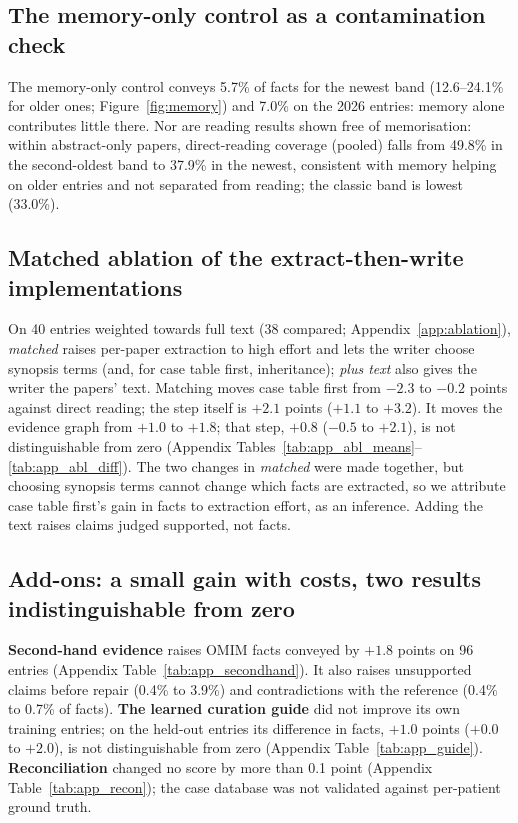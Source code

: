 \documentclass{article} %
\begin{document}
\subsection{The memory-only control as a contamination check}
\label{sec:memory}
The memory-only control conveys 5.7\% of facts for the newest band (12.6--24.1\% for older ones; Figure~\ref{fig:memory}) and 7.0\% on the 2026 entries: memory alone contributes little there. Nor are reading results shown free of memorisation: within abstract-only papers, direct-reading coverage (pooled) falls from 49.8\% in the second-oldest band to 37.9\% in the newest, consistent with memory helping on older entries and not separated from reading; the classic band is lowest (33.0\%).

\subsection{Matched ablation of the extract-then-write implementations}
\label{sec:ablation}
On 40 entries weighted towards full text (38 compared; Appendix~\ref{app:ablation}), \emph{matched} raises per-paper extraction to high effort and lets the writer choose synopsis terms (and, for case table first, inheritance); \emph{plus text} also gives the writer the papers' text. Matching moves case table first from $-2.3$ to $-0.2$ points against direct reading; the step itself is $+2.1$ points ($+1.1$ to $+3.2$). It moves the evidence graph from $+1.0$ to $+1.8$; that step, $+0.8$ ($-0.5$ to $+2.1$), is not distinguishable from zero (Appendix Tables~\ref{tab:app_abl_means}--\ref{tab:app_abl_diff}). The two changes in \emph{matched} were made together, but choosing synopsis terms cannot change which facts are extracted, so we attribute case table first's gain in facts to extraction effort, as an inference. Adding the text raises claims judged supported, not facts.

\subsection{Add-ons: a small gain with costs, two results indistinguishable from zero}
\label{sec:addons}
\textbf{Second-hand evidence} raises OMIM facts conveyed by $+1.8$ points on 96 entries (Appendix Table~\ref{tab:app_secondhand}). It also raises unsupported claims before repair (0.4\% to 3.9\%) and contradictions with the reference (0.4\% to 0.7\% of facts). \textbf{The learned curation guide} did not improve its own training entries; on the held-out entries its difference in facts, $+1.0$ points ($+0.0$ to $+2.0$), is not distinguishable from zero (Appendix Table~\ref{tab:app_guide}). \textbf{Reconciliation} changed no score by more than 0.1 point (Appendix Table~\ref{tab:app_recon}); the case database was not validated against per-patient ground truth.
\end{document}
